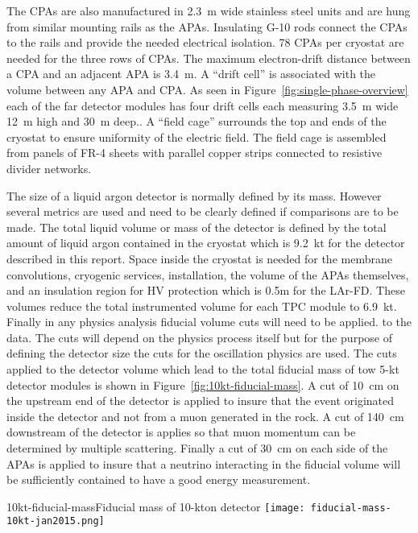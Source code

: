  The CPAs are also manufactured in 2.3~m wide stainless steel units and are hung from similar mounting rails as the APAs. Insulating G-10 rods connect the CPAs to the rails and provide the needed electrical isolation. 78 CPAs per cryostat are needed for the three rows of CPAs. The maximum electron-drift distance between a CPA and an adjacent APA is 3.4~m. A ``drift cell'' is associated with the volume between any APA and CPA. As seen in Figure~\ref{fig:single-phase-overview} each of the far detector modules has four drift cells each measuring 3.5~m wide 12~m high and 30~m deep..  A ``field cage'' surrounds the top and ends of the cryostat to ensure uniformity of the electric field. The field cage is assembled from panels of FR-4 sheets with parallel copper strips connected to resistive divider networks.
 
 


The size of a liquid argon detector is normally defined by its mass. However several metrics are used and need to be clearly defined if comparisons are to be made. The total liquid volume or mass of the detector is defined by the total amount of liquid argon contained in the cryostat which is 9.2~kt for the detector described in this report. Space inside the cryostat is needed for the membrane convolutions, cryogenic services, installation, the volume of the APAs themselves, and an insulation region for HV protection which is 0.5m for the LAr-FD. These volumes reduce the total instrumented volume for each TPC module to 6.9~kt. Finally in any physics analysis fiducial volume cuts will need to be applied. to the data. The cuts will depend on the physics process itself but for the purpose of defining the detector size the cuts for the oscillation physics are used. The cuts applied to the detector volume which lead to the total fiducial mass of tow 5-kt detector modules is shown in Figure~\ref{fig:10kt-fiducial-mass}. A cut of 10~cm on the upstream end of the detector is applied to insure that the event originated inside the detector and not from a muon generated in the rock. A cut of 140~cm downstream of the detector is applies so that muon momentum can be determined by multiple scattering. Finally a cut of 30~cm on each side of the APAs is applied to insure that a neutrino interacting in the fiducial volume will be sufficiently contained to have a good energy measurement.

\begin{cdrfigure}{10kt-fiducial-mass}{Fiducial mass of 10-kton detector}
 \texttt{[image: fiducial-mass-10kt-jan2015.png]}
 \end{cdrfigure}

